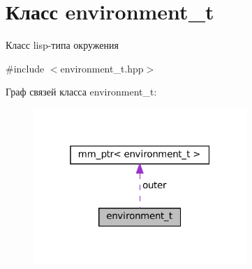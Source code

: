 \hypertarget{classenvironment__t}{}\section{Класс environment\+\_\+t}
\label{classenvironment__t}


Класс lisp-\/типа окружения  




{\ttfamily \#include $<$environment\+\_\+t.\+hpp$>$}



Граф связей класса environment\+\_\+t\+:\nopagebreak
\begin{figure}[H]
\begin{center}
\leavevmode
\includegraphics[width=229pt]{classenvironment__t__coll__graph}
\end{center}
\end{figure}
